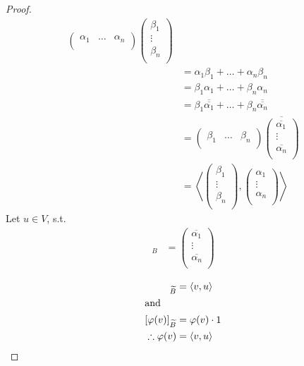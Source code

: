 \documentclass[fleqn, a4paper, 12pt]{article}
\theoremstyle{definition}
\theoremstyle{theorem}
\theoremstyle{remark}
\numberwithin{corollary}{theorem}
\numberwithin{equation}{theorem}
\begin{document}
\begin{proof}
\begin{align*}
\begin{pmatrix}
				\alpha_1 & \dots & \alpha_n\\
			\end{pmatrix}
			\begin{pmatrix}
				\beta_1\\
				\vdots\\
				\beta_n\\
			\end{pmatrix}\\
		&= \alpha_1 \beta_1 + \dots + \alpha_n \beta_n\\
		&= \beta_1 \alpha_1 + \dots + \beta_n \alpha_n\\
		&= \beta_1 \overline{\overline{\alpha_1}} + \dots + \beta_n \overline{\overline{\alpha_n}}\\
		&= 
			\begin{pmatrix}
				\beta_1 & \dots & \beta_n\\
			\end{pmatrix}
			\overline
			{
				\begin{pmatrix}
					\overline{\alpha_1}\\
					\vdots\\
					\overline{\alpha_n}\\
				\end{pmatrix}
			}\\
		&=
			\left\langle
				\begin{pmatrix}
					\beta_1\\
					\vdots\\
					\beta_n\\
				\end{pmatrix}
				,
				\begin{pmatrix}
					\alpha_1\\
					\vdots\\
					\alpha_n\\
				\end{pmatrix}
			\right\rangle
	\end{align*}
	Let $u \in V$, s.t.
	\begin{align*}
		[u]_B &=
			\begin{pmatrix}
				\overline{\alpha_1}\\
				\vdots\\
				\overline{\alpha_n}\\
			\end{pmatrix}
	\end{align*}
	
	\begin{align*}
		[\varphi(v)]_{\widetilde{B}} &= \langle v, u \rangle\\
		\intertext{and}
		[\varphi(v)]_{\widetilde{B}} &= \varphi(v) \cdot 1\\
		\therefore \varphi(v) &= \langle v, u \rangle
	\end{align*}
\end{proof}
\end{document}
